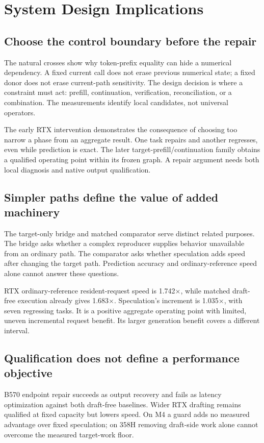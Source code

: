 \section{System Design Implications}
\label{sec:discussion}
\subsection{Choose the control boundary before the repair}
The natural crosses show why token-prefix equality can hide a numerical dependency. A fixed current call does not erase previous numerical state; a fixed donor does not erase current-path sensitivity. The design decision is where a constraint must act: prefill, continuation, verification, reconciliation, or a combination. The measurements identify local candidates, not universal operators.

The early RTX intervention demonstrates the consequence of choosing too narrow a phase from an aggregate result. One task repairs and another regresses, even while prediction is exact. The later target-prefill/continuation family obtains a qualified operating point within its frozen graph. A repair argument needs both local diagnosis and native output qualification.

\subsection{Simpler paths define the value of added machinery}
The target-only bridge and matched comparator serve distinct related purposes. The bridge asks whether a complex reproducer supplies behavior unavailable from an ordinary path. The comparator asks whether speculation adds speed after changing the target path. Prediction accuracy and ordinary-reference speed alone cannot answer these questions.

RTX ordinary-reference resident-request speed is 1.742$\times$, while matched draft-free execution already gives 1.683$\times$. Speculation's increment is 1.035$\times$, with seven regressing tasks. It is a positive aggregate operating point with limited, uneven incremental request benefit. Its larger generation benefit covers a different interval.

\subsection{Qualification does not define a performance objective}
B570 endpoint repair succeeds as output recovery and fails as latency optimization against both draft-free baselines. Wider RTX drafting remains qualified at fixed capacity but lowers speed. On M4 a guard adds no measured advantage over fixed speculation; on 358H removing draft-side work alone cannot overcome the measured target-work floor.

